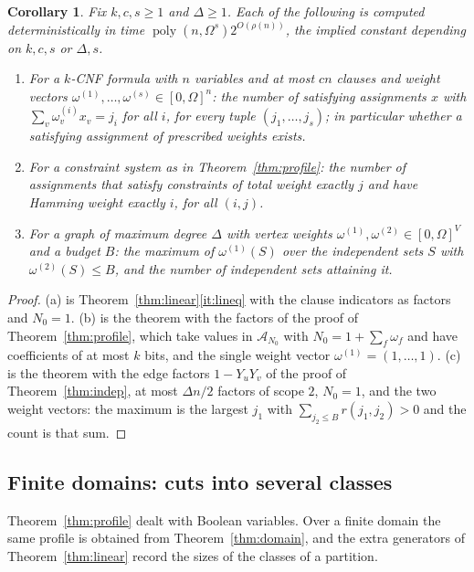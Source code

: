 \documentclass[11pt,reqno]{amsart}
\numberwithin{equation}{section}
\theoremstyle{plain}
\newtheorem{corollary}[theorem]{Corollary}
\theoremstyle{definition}
\theoremstyle{remark}
\DeclareMathOperator{\poly}{poly}
\newcommand{\A}{\mathcal{A}}
\newcommand{\rhon}{\rho}
\begin{document}
\begin{corollary}\label{cor:linear}
Fix $k,c,s\ge1$ and $\Delta\ge1$. Each of the following is computed
deterministically in time $\poly(n,\Omega^s)2^{O(\rhon(n))}$, the implied
constant depending on $k,c,s$ or $\Delta,s$.
\begin{enumerate}[label=\textup{(\alph*)},leftmargin=2.2em]
\item For a $k$-CNF formula with $n$ variables and at most $cn$ clauses and
weight vectors $\omega^{(1)},\dots,\omega^{(s)}\in[0,\Omega]^n$: the number of
satisfying assignments $x$ with $\sum_v\omega^{(i)}_vx_v=j_i$ for all $i$, for
every tuple $(j_1,\dots,j_s)$; in particular whether a satisfying assignment of
prescribed weights exists.
\item For a constraint system as in Theorem~\ref{thm:profile}: the number of
assignments that satisfy constraints of total weight exactly $j$ and have Hamming
weight exactly $i$, for all $(i,j)$.
\item For a graph of maximum degree $\Delta$ with vertex weights
$\omega^{(1)},\omega^{(2)}\in[0,\Omega]^V$ and a budget $B$: the maximum of
$\omega^{(1)}(S)$ over the independent sets $S$ with $\omega^{(2)}(S)\le B$, and
the number of independent sets attaining it.
\end{enumerate}
\end{corollary}

\begin{proof}
(a) is Theorem~\ref{thm:linear}\ref{it:lineq} with the clause indicators as
factors and $N_0=1$. (b) is the theorem with the factors of the proof of
Theorem~\ref{thm:profile}, which take values in $\A_{N_0}$ with
$N_0=1+\sum_f\omega_f$ and have coefficients of at most $k$ bits, and the single
weight vector $\omega^{(1)}=(1,\dots,1)$. (c) is the theorem with the edge
factors $1-Y_uY_v$ of the proof of Theorem~\ref{thm:indep}, at most $\Delta n/2$
factors of scope $2$, $N_0=1$, and the two weight vectors: the maximum is the
largest $j_1$ with $\sum_{j_2\le B}r(j_1,j_2)>0$ and the count is that sum.
\end{proof}

\subsection{Finite domains: cuts into several classes}\label{ssec:qcut}
Theorem~\ref{thm:profile} dealt with Boolean variables. Over a finite domain the
same profile is obtained from Theorem~\ref{thm:domain}, and the extra generators
of Theorem~\ref{thm:linear} record the sizes of the classes of a partition.
\end{document}
